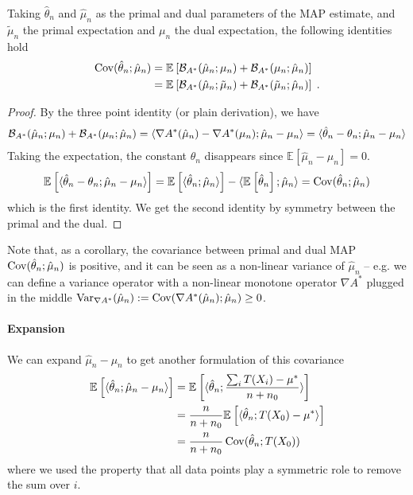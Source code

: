 \documentclass{article}
\newcommand*{\expect}[2][]{\ensuremath{\mathbb{E}_{#1} \left[ #2 \right] }} %
\newcommand{\logpart}{A}
\newcommand{\conj}{\logpart^*}
\newcommand{\bregmanconj}{\cB_{\logpart^*}}
\newcommand{\nat}{\theta}
\newcommand{\MAPm}{\hat \mu_n}
\newcommand{\MAPt}{\hat \nat_n}
\begin{document}
\begin{lemma}
\label{lem:covariance}
Taking  $\MAPt$ and $\MAPm$ as the primal and dual parameters of the MAP estimate, and $\tilde \mu_n$ the primal expectation and $\mu_n$ the dual expectation, the following identities hold
	\begin{align}
	\Cov(\hat \nat_n ; \MAPm )  
	&=\expect{\bregmanconj(\MAPm ; \mu_n)
	+ \bregmanconj(\mu_n ; \MAPm)} \\
	&=\expect{\bregmanconj(\MAPm ; \tilde \mu_n)
	+ \bregmanconj(\tilde \mu_n ; \MAPm)} \; .
\end{align}
\end{lemma}
\begin{proof}
By the three point identity (or plain derivation), we have 
\begin{align}
	\bregmanconj(\MAPm ; \mu_n)
	+ \bregmanconj(\mu_n ; \MAPm)
	= \langle \nabla \conj (\hat \mu_n) - \nabla \conj(\mu_n) ;  \hat \mu_n - \mu_n \rangle 
	= \langle \MAPt - \theta_n;  \MAPm- \mu_n \rangle 
\end{align}
Taking the expectation,  the constant $\theta_n$ disappears since $\expect{\hat \mu_n - \mu_n}=0$.
\begin{align}
	\expect{\langle \MAPt - \theta_n;  \MAPm- \mu_n \rangle } 
	 = \expect{\langle \MAPt; \MAPm \rangle} - \langle \expect{\MAPt} ; \MAPm \rangle
	= \Cov(\hat \nat_n ; \hat \mu_n ) 
\end{align}
which is the first identity. We get the second identity by symmetry between the primal and the dual.
\end{proof}

Note that, as a corollary, the covariance between primal and dual MAP
$\Cov(\hat \nat_n ; \hat \mu_n )$ is positive, and it can be seen as a non-linear variance of $\hat \mu_n$ -- e.g. we can define a variance operator with a non-linear monotone operator $\nabla\conj$ plugged in the middle $\Var_{\nabla \conj}(\hat \mu_n) := \Cov(\nabla\conj(\hat \mu_n) ; \hat \mu_n ) \geq 0$.

\paragraph{Expansion}
We can expand  $\hat \mu_n - \mu_n$ to get another formulation of this covariance
\begin{align}
	\expect{\langle \hat \nat_n ; \hat \mu_n - \mu_n \rangle}
	&= \expect{\langle \hat \nat_n ; \frac{\sum_i T(X_i) - \mu^*}{n+n_0} \rangle}  \\
	& = \frac{n}{n+n_0} \expect{\langle \hat \nat_n ; T(X_0) - \mu^*\rangle} \\
	&= \frac{n}{n+n_0} \Cov(\hat \nat_n ; T(X_0) ) 
	\label{eq:covariance_expansion}
\end{align}
where we used the property that all data points play a symmetric role to remove the sum over $i$.
\end{document}

